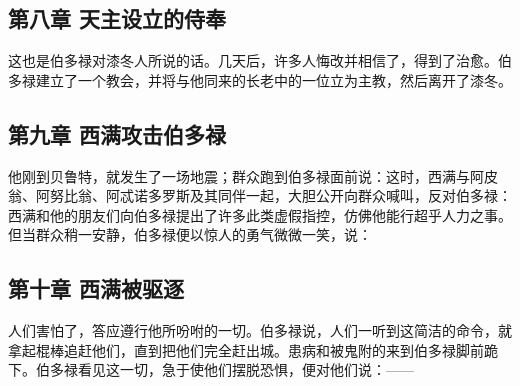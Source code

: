 
\subsection{第八章  天主设立的侍奉}

这也是伯多禄对漆冬人所说的话。几天后，许多人悔改并相信了，得到了治愈。伯多禄建立了一个教会，并将与他同来的长老中的一位立为主教，然后离开了漆冬。\par


\subsection{第九章  西满攻击伯多禄}

他刚到贝鲁特，就发生了一场地震；群众跑到伯多禄面前说：这时，西满与阿皮翁、阿努比翁、阿忒诺多罗斯及其同伴一起，大胆公开向群众喊叫，反对伯多禄：西满和他的朋友们向伯多禄提出了许多此类虚假指控，仿佛他能行超乎人力之事。但当群众稍一安静，伯多禄便以惊人的勇气微微一笑，说：\par


\subsection{第十章  西满被驱逐}

人们害怕了，答应遵行他所吩咐的一切。伯多禄说，人们一听到这简洁的命令，就拿起棍棒追赶他们，直到把他们完全赶出城。患病和被鬼附的来到伯多禄脚前跪下。伯多禄看见这一切，急于使他们摆脱恐惧，便对他们说：——\par

